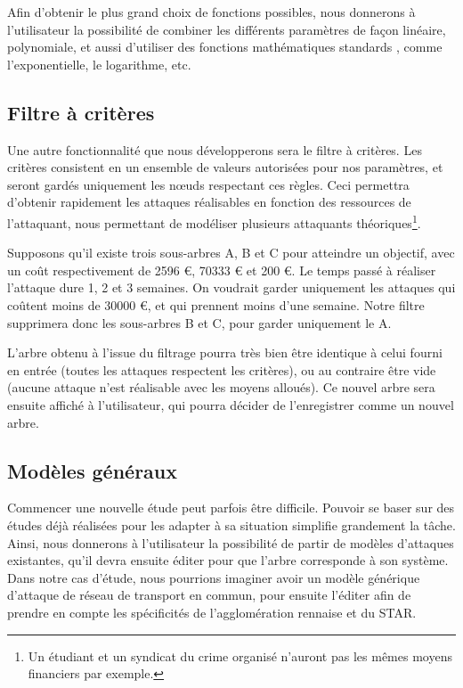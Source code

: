         Afin d'obtenir le plus grand choix de fonctions possibles, nous donnerons à l'utilisateur la possibilité de combiner les différents paramètres de façon linéaire, polynomiale, et aussi d'utiliser des fonctions mathématiques \og standards \fg, comme l'exponentielle, le logarithme, etc.

    \subsection{Filtre à critères}
        \label{sec:filtre}

        Une autre fonctionnalité que nous développerons sera le filtre à critères. Les critères consistent en un ensemble de valeurs autorisées pour nos paramètres, et seront gardés uniquement les nœuds respectant ces règles. Ceci permettra d'obtenir rapidement les attaques réalisables en fonction des ressources de l'attaquant, nous permettant de modéliser plusieurs attaquants théoriques\footnote{Un étudiant et un syndicat du crime organisé n'auront pas les mêmes moyens financiers par exemple.}.
        
        Supposons qu'il existe trois sous-arbres A, B et C pour atteindre un objectif, avec un coût respectivement de 2596 €, 70333 € et 200 €. Le temps passé à réaliser l'attaque dure 1, 2 et 3 semaines. On voudrait garder uniquement les attaques qui coûtent moins de 30000 €, et qui prennent moins d'une semaine. Notre filtre supprimera donc les sous-arbres B et C, pour garder uniquement le A.

        L'arbre obtenu à l'issue du filtrage pourra très bien être identique à celui fourni en entrée (toutes les attaques respectent les critères), ou au contraire être vide (aucune attaque n'est réalisable avec les moyens alloués). Ce nouvel arbre sera ensuite affiché à l'utilisateur, qui pourra décider de l'enregistrer comme un nouvel arbre.

    \subsection{Modèles généraux}
        \label{sec:modele}

        Commencer une nouvelle étude peut parfois être difficile. Pouvoir se baser sur des études déjà réalisées pour les adapter à sa situation simplifie grandement la tâche. Ainsi, nous donnerons à l'utilisateur la possibilité de partir de modèles d'attaques existantes, qu'il devra ensuite éditer pour que l'arbre corresponde à son système. Dans notre cas d'étude, nous pourrions imaginer avoir un modèle générique d'attaque de réseau de transport en commun, pour ensuite l'éditer afin de prendre en compte les spécificités de l'agglomération rennaise et du STAR.

